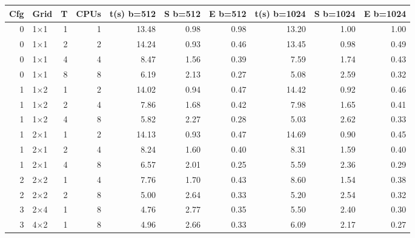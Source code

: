 \begin{tabular}{rlrrrrrrrr}
\toprule
Cfg & Grid & T & CPUs & t(s) b=512 & S b=512 & E b=512 & t(s) b=1024 & S b=1024 & E b=1024 \\
\midrule
0 & 1$\times$1 & 1 & 1 & 13.48 & 0.98 & 0.98 & 13.20 & 1.00 & 1.00 \\
0 & 1$\times$1 & 2 & 2 & 14.24 & 0.93 & 0.46 & 13.45 & 0.98 & 0.49 \\
0 & 1$\times$1 & 4 & 4 & 8.47 & 1.56 & 0.39 & 7.59 & 1.74 & 0.43 \\
0 & 1$\times$1 & 8 & 8 & 6.19 & 2.13 & 0.27 & 5.08 & 2.59 & 0.32 \\
1 & 1$\times$2 & 1 & 2 & 14.02 & 0.94 & 0.47 & 14.42 & 0.92 & 0.46 \\
1 & 1$\times$2 & 2 & 4 & 7.86 & 1.68 & 0.42 & 7.98 & 1.65 & 0.41 \\
1 & 1$\times$2 & 4 & 8 & 5.82 & 2.27 & 0.28 & 5.03 & 2.62 & 0.33 \\
1 & 2$\times$1 & 1 & 2 & 14.13 & 0.93 & 0.47 & 14.69 & 0.90 & 0.45 \\
1 & 2$\times$1 & 2 & 4 & 8.24 & 1.60 & 0.40 & 8.31 & 1.59 & 0.40 \\
1 & 2$\times$1 & 4 & 8 & 6.57 & 2.01 & 0.25 & 5.59 & 2.36 & 0.29 \\
2 & 2$\times$2 & 1 & 4 & 7.76 & 1.70 & 0.43 & 8.60 & 1.54 & 0.38 \\
2 & 2$\times$2 & 2 & 8 & 5.00 & 2.64 & 0.33 & 5.20 & 2.54 & 0.32 \\
3 & 2$\times$4 & 1 & 8 & 4.76 & 2.77 & 0.35 & 5.50 & 2.40 & 0.30 \\
3 & 4$\times$2 & 1 & 8 & 4.96 & 2.66 & 0.33 & 6.09 & 2.17 & 0.27 \\
\bottomrule
\end{tabular}
